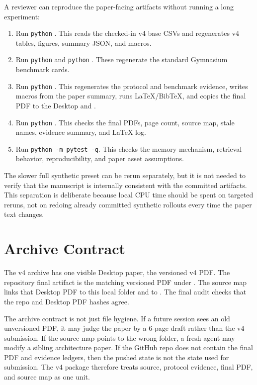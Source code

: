 \documentclass{article}
\begin{document}
A reviewer can reproduce the paper-facing artifacts without running a long
experiment:
\begin{enumerate}
\item Run \texttt{python} . This reads the
checked-in v4 base CSVs and regenerates v4 tables, figures, summary JSON, and
macros.
\item Run \texttt{python} 
and \texttt{python} .
These regenerate the standard Gymnasium benchmark cards.
\item Run \texttt{python} . This regenerates the
protocol and benchmark evidence, writes macros from the paper summary, runs
LaTeX/BibTeX, and copies the final PDF to the Desktop and .
\item Run \texttt{python} . This checks the final
PDFs, page count, source map, stale names, evidence summary, and LaTeX log.
\item Run \texttt{python -m pytest -q}. This checks the memory mechanism,
retrieval behavior, reproducibility, and paper asset assumptions.
\end{enumerate}

The slower full synthetic preset can be rerun separately, but it is not needed
to verify that the manuscript is internally consistent with the committed
artifacts. This separation is deliberate because local CPU time should be spent
on targeted reruns, not on redoing already committed synthetic rollouts every
time the paper text changes.

\section{Archive Contract}
\label{app:archive}

The v4 archive has one visible Desktop paper, the versioned v4 PDF. The
repository final artifact is the matching versioned PDF under
. The source map links that Desktop PDF to this local folder and to
. The final audit
checks that the repo and Desktop PDF hashes agree.

The archive contract is not just file hygiene. If a future session sees an old
unversioned PDF, it may judge the paper by a 6-page draft rather than the v4
submission. If the source map points to the wrong folder, a fresh agent may
modify a sibling architecture paper. If the GitHub repo does not contain the
final PDF and evidence ledgers, then the pushed state is not the state used for
submission. The v4 package therefore treats source, protocol evidence, final PDF,
and source map as one unit.
\end{document}

